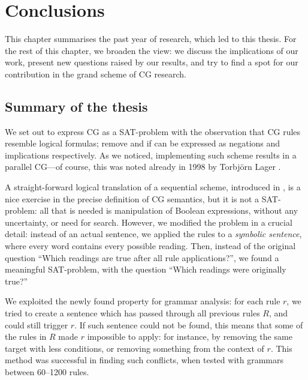 \chapter{Conclusions}
\label{chapterConclusions}


This chapter summarises the past year of research, which led to this thesis. 
For the rest of this chapter, we broaden the view: we discuss the implications of our work, 
present new questions raised by our results, and try to find a spot for our contribution 
in the grand scheme of CG research.

\section{Summary of the thesis}

We set out to express CG as a SAT-problem with the observation that CG rules resemble logical formulas; {\sc remove} and {\sc if} can be expressed as negations and implications respectively. As we noticed, implementing such scheme results in a parallel CG---of course, this was noted already in 1998 by Torbjörn Lager \cite{lager98}.

A straight-forward logical translation of a sequential scheme, introduced in \cite{lager_nivre01}, is a nice exercise in the precise definition of CG semantics, 
but it is not a SAT-problem: all that is needed is manipulation of Boolean expressions, 
without any uncertainty, or need for search. 
However, we modified the problem in a crucial detail: instead of an actual sentence, 
we applied the rules to a {\em symbolic sentence}, where every word contains every possible reading.
Then, instead of the original question ``Which readings are true after all rule applications?'', 
we found a meaningful SAT-problem, with the question ``Which readings were originally true?''

We exploited the newly found property for grammar analysis: 
for each rule $r$, we tried to create a sentence 
which has passed through all previous rules $R$, and could still trigger $r$.
If such sentence could not be found, this means that some of the rules in $R$ made $r$ impossible to apply: for instance, by removing the same target with less conditions, or removing something from the context of $r$.
This method was successful in finding such conflicts, when tested with grammars between 60--1200 rules.



